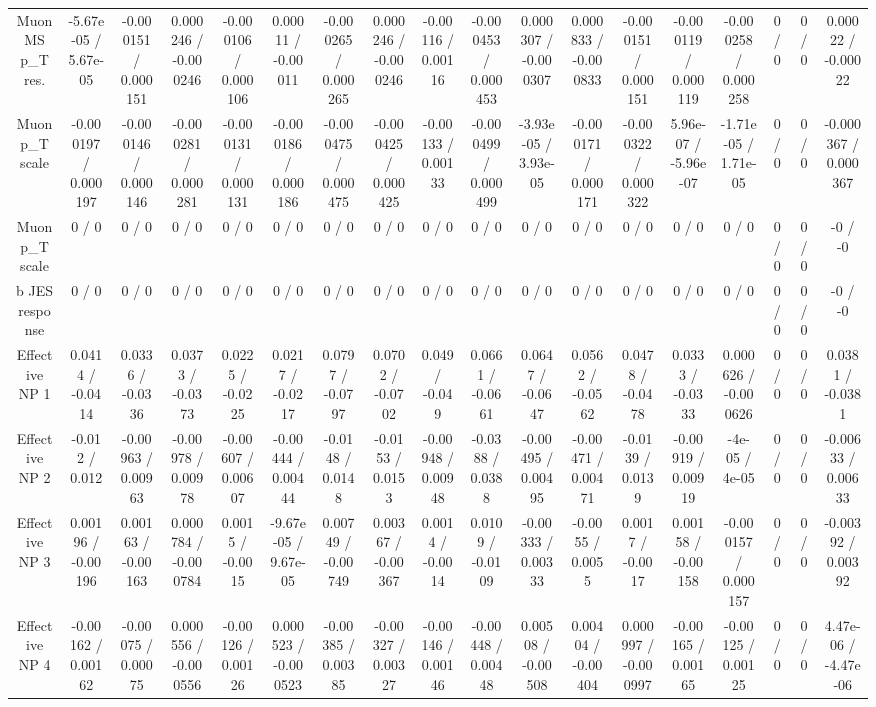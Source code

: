 \documentclass[10pt]{article}
\begin{document}
\begin{table}[htbp]
\begin{center}
\begin{tabular}{|c|c|c|c|c|c|c|c|c|c|c|c|c|c|c|c|c|c|}
  Muon MS p_{T} res. & -5.67e-05 / 5.67e-05 & -0.000151 / 0.000151 & 0.000246 / -0.000246 & -0.000106 / 0.000106 & 0.00011 / -0.00011 & -0.000265 / 0.000265 & 0.000246 / -0.000246 & -0.00116 / 0.00116 & -0.000453 / 0.000453 & 0.000307 / -0.000307 & 0.000833 / -0.000833 & -0.000151 / 0.000151 & -0.000119 / 0.000119 & -0.000258 / 0.000258 & 0 / 0 & 0 / 0 & 0.00022 / -0.00022 \\ 
  Muon p_{T} scale & -0.000197 / 0.000197 & -0.000146 / 0.000146 & -0.000281 / 0.000281 & -0.000131 / 0.000131 & -0.000186 / 0.000186 & -0.000475 / 0.000475 & -0.000425 / 0.000425 & -0.00133 / 0.00133 & -0.000499 / 0.000499 & -3.93e-05 / 3.93e-05 & -0.000171 / 0.000171 & -0.000322 / 0.000322 & 5.96e-07 / -5.96e-07 & -1.71e-05 / 1.71e-05 & 0 / 0 & 0 / 0 & -0.000367 / 0.000367 \\ 
  Muon p_{T} scale & 0 / 0 & 0 / 0 & 0 / 0 & 0 / 0 & 0 / 0 & 0 / 0 & 0 / 0 & 0 / 0 & 0 / 0 & 0 / 0 & 0 / 0 & 0 / 0 & 0 / 0 & 0 / 0 & 0 / 0 & 0 / 0 & -0 / -0 \\ 
  b JES response & 0 / 0 & 0 / 0 & 0 / 0 & 0 / 0 & 0 / 0 & 0 / 0 & 0 / 0 & 0 / 0 & 0 / 0 & 0 / 0 & 0 / 0 & 0 / 0 & 0 / 0 & 0 / 0 & 0 / 0 & 0 / 0 & -0 / -0 \\ 
  Effective NP 1 & 0.0414 / -0.0414 & 0.0336 / -0.0336 & 0.0373 / -0.0373 & 0.0225 / -0.0225 & 0.0217 / -0.0217 & 0.0797 / -0.0797 & 0.0702 / -0.0702 & 0.049 / -0.049 & 0.0661 / -0.0661 & 0.0647 / -0.0647 & 0.0562 / -0.0562 & 0.0478 / -0.0478 & 0.0333 / -0.0333 & 0.000626 / -0.000626 & 0 / 0 & 0 / 0 & 0.0381 / -0.0381 \\ 
  Effective NP 2 & -0.012 / 0.012 & -0.00963 / 0.00963 & -0.00978 / 0.00978 & -0.00607 / 0.00607 & -0.00444 / 0.00444 & -0.0148 / 0.0148 & -0.0153 / 0.0153 & -0.00948 / 0.00948 & -0.0388 / 0.0388 & -0.00495 / 0.00495 & -0.00471 / 0.00471 & -0.0139 / 0.0139 & -0.00919 / 0.00919 & -4e-05 / 4e-05 & 0 / 0 & 0 / 0 & -0.00633 / 0.00633 \\ 
  Effective NP 3 & 0.00196 / -0.00196 & 0.00163 / -0.00163 & 0.000784 / -0.000784 & 0.0015 / -0.0015 & -9.67e-05 / 9.67e-05 & 0.00749 / -0.00749 & 0.00367 / -0.00367 & 0.0014 / -0.0014 & 0.0109 / -0.0109 & -0.00333 / 0.00333 & -0.0055 / 0.0055 & 0.0017 / -0.0017 & 0.00158 / -0.00158 & -0.000157 / 0.000157 & 0 / 0 & 0 / 0 & -0.00392 / 0.00392 \\ 
  Effective NP 4 & -0.00162 / 0.00162 & -0.00075 / 0.00075 & 0.000556 / -0.000556 & -0.00126 / 0.00126 & 0.000523 / -0.000523 & -0.00385 / 0.00385 & -0.00327 / 0.00327 & -0.00146 / 0.00146 & -0.00448 / 0.00448 & 0.00508 / -0.00508 & 0.00404 / -0.00404 & 0.000997 / -0.000997 & -0.00165 / 0.00165 & -0.00125 / 0.00125 & 0 / 0 & 0 / 0 & 4.47e-06 / -4.47e-06 \\ 

\end{tabular}
\end{center}
\end{table}
\end{document}
